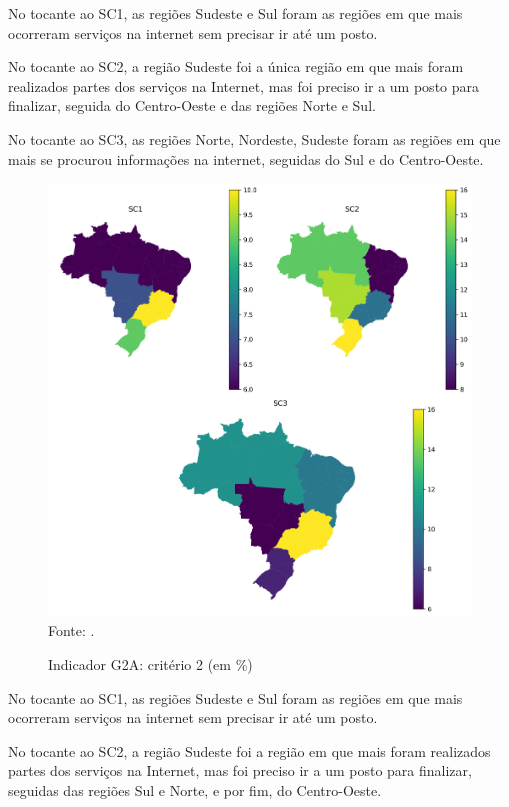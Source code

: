 No tocante ao SC1, as regiões Sudeste e Sul foram as regiões em que mais ocorreram serviços na internet sem precisar ir até um posto. 

No tocante ao SC2, a região Sudeste foi a única região em que mais foram realizados partes dos serviços na Internet, mas foi preciso ir a um posto para finalizar, seguida do Centro-Oeste e das regiões Norte e Sul.

No tocante ao SC3, as regiões Norte, Nordeste, Sudeste foram as regiões em que mais se procurou informações na internet, seguidas do Sul e do Centro-Oeste.

\begin{figure}[H]
	\centering
	\caption{Indicador G2A: critério 2 (em \%)}
	\includegraphics[width=1\linewidth]{figuras/mapa_coropletico_tic_domicilios_2024_g2a_2.png}
	\label{fig:mapa_coropletico_tic_domicilios_2024_g2a_2}
	\footnotesize{Fonte: \cite{tic_domicilios_2024_g2a}.}
\end{figure}

No tocante ao SC1, as regiões Sudeste e Sul foram as regiões em que mais ocorreram serviços na internet sem precisar ir até um posto.

No tocante ao SC2, a região Sudeste foi a região em que mais foram realizados partes dos serviços na Internet, mas foi preciso ir a um posto para finalizar, seguidas  das regiões Sul e Norte, e por fim, do Centro-Oeste.

